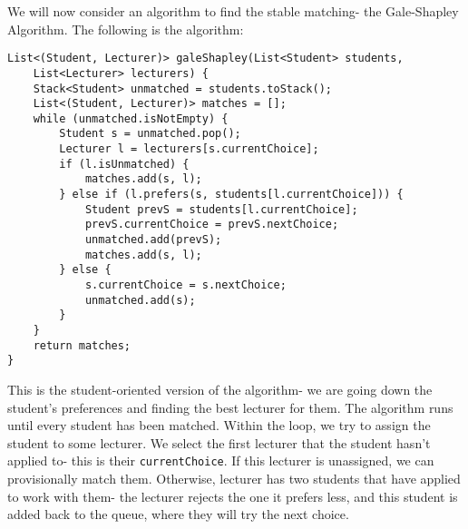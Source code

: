 \documentclass[a4paper, openany]{memoir}
\begin{document}
    We will now consider an algorithm to find the stable matching- the Gale-Shapley Algorithm. The following is the algorithm:
\begin{lstlisting}[language=pseudocode]
List<(Student, Lecturer)> galeShapley(List<Student> students, 
    List<Lecturer> lecturers) {
    Stack<Student> unmatched = students.toStack();
    List<(Student, Lecturer)> matches = [];
    while (unmatched.isNotEmpty) {
        Student s = unmatched.pop();
        Lecturer l = lecturers[s.currentChoice];
        if (l.isUnmatched) {
            matches.add(s, l);
        } else if (l.prefers(s, students[l.currentChoice])) {
            Student prevS = students[l.currentChoice];
            prevS.currentChoice = prevS.nextChoice;
            unmatched.add(prevS);
            matches.add(s, l);
        } else {
            s.currentChoice = s.nextChoice;
            unmatched.add(s);
        }
    }
    return matches;
}
\end{lstlisting}
    \noindent This is the student-oriented version of the algorithm- we are going down the student's preferences and finding the best lecturer for them. The algorithm runs until every student has been matched. Within the loop, we try to assign the student to some lecturer. We select the first lecturer that the student hasn't applied to- this is their \texttt{currentChoice}. If this lecturer is unassigned, we can provisionally match them. Otherwise, lecturer has two students that have applied to work with them- the lecturer rejects the one it prefers less, and this student is added back to the queue, where they will try the next choice. 
    
\end{document}
